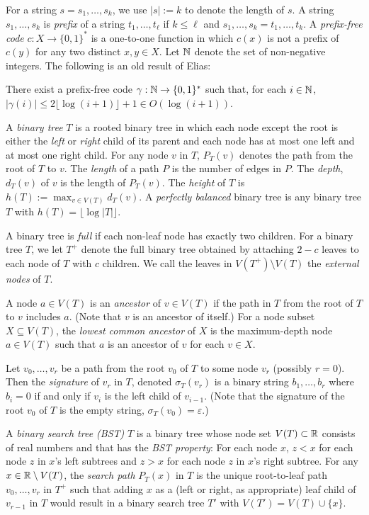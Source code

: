 \documentclass[kpfonts]{patmorin}
\begin{document}
For a string $s=s_1,\ldots,s_k$, we use $|s|:=k$ to denote the length of $s$. A string $s_1,\ldots,s_k$ is \emph{prefix} of a string $t_1,\ldots,t_\ell$ if $k\le \ell$ and $s_1,\ldots,s_k=t_1,\ldots,t_k$.  A \emph{prefix-free code} $c:X\to\{0,1\}^*$ is a one-to-one function in which $c(x)$ is not a prefix of $c(y)$ for any two distinct $x,y\in X$.  Let $\mathbb{N}$ denote the set of non-negative integers.  The following is an old result of Elias:

\begin{lem}
    There exist a prefix-free code $\gamma:\mathbb{N}\to\{0,1\}^*$ such that, for each $i\in\mathbb{N}$, $|\gamma(i)|\le 2\lfloor\log(i+1)\rfloor + 1\in O(\log(i+1))$.
\end{lem}

A \emph{binary tree} $T$ is a rooted binary tree in which each node except the root is either the \emph{left} or \emph{right} child of its parent and each node has at most one left and at most one right child.  For any node $v$ in $T$, $P_T(v)$ denotes the path from the root of $T$ to $v$.  The \emph{length} of a path $P$ is the number of edges in $P$.  The \emph{depth}, $d_T(v)$ of $v$ is the length of $P_T(v)$.  The \emph{height} of $T$ is $h(T):=\max_{v\in V(T)} d_T(v)$.  A \emph{perfectly balanced} binary tree is any binary tree $T$ with $h(T)=\lfloor\log|T|\rfloor$.

A binary tree is \emph{full} if each non-leaf node has exactly two children. For a binary tree $T$, we let $T^+$ denote the full binary tree obtained by attaching $2-c$ leaves to each node of $T$ with $c$ children.  We call the leaves in $V(T^+)\setminus V(T)$ the \emph{external nodes} of $T$.

A node $a\in V(T)$ is an \emph{ancestor} of $v\in V(T)$ if the path in $T$ from the root of $T$ to $v$ includes $a$.  (Note that $v$ is an ancestor of itself.) For a node subset $X\subseteq V(T)$, the \emph{lowest common ancestor} of $X$ is the maximum-depth node $a\in V(T)$ such that $a$ is an ancestor of $v$ for each $v\in X$.

Let $v_0,\ldots,v_{r}$ be a path from the root $v_0$ of $T$ to some node $v_r$ (possibly $r=0$).  Then the \emph{signature} of $v_r$ in $T$, denoted $\sigma_T(v_r)$ is a binary string $b_1,\ldots,b_r$ where $b_i=0$ if and only if $v_{i}$ is the left child of $v_{i-1}$.  (Note that the signature of the root $v_0$ of $T$ is the empty string,  $\sigma_T(v_0)=\varepsilon$.)

A \emph{binary search tree (BST)} $T$ is a binary tree  whose node set $V(T)\subset\mathbb{R}$ consists of real numbers and that has the \emph{BST property}:  For each node $x$, $z<x$ for each node $z$ in $x$'s left subtrees and $z>x$ for each node $z$ in $x$'s right subtree. For any $x\in\mathbb{R}\setminus V(T)$, the \emph{search path} $P_T(x)$ in $T$ is the unique root-to-leaf path $v_0,\ldots,v_r$ in $T^+$ such that adding $x$ as a (left or right, as appropriate) leaf child of $v_{r-1}$ in $T$ would result in a binary search tree $T'$ with $V(T')=V(T)\cup\{x\}$.
\end{document}
